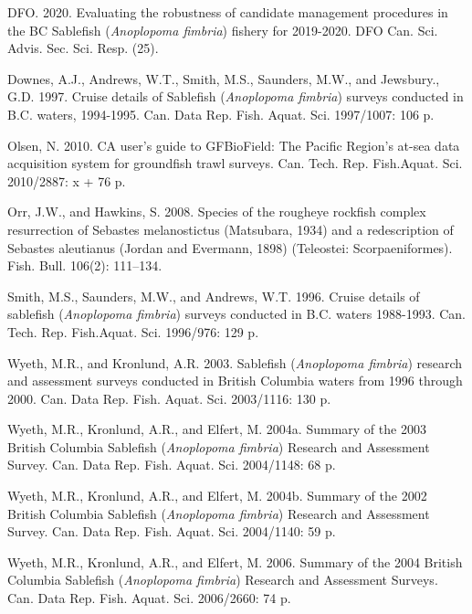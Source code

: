 \documentclass[12pt]{article}\usepackage[]{graphicx}\usepackage[]{color}
\begin{document}
\leavevmode\hypertarget{ref-DFO2020}{}%
DFO. 2020. Evaluating the robustness of candidate management procedures in the BC Sablefish (\emph{Anoplopoma fimbria}) fishery for 2019-2020. DFO Can. Sci. Advis. Sec. Sci. Resp. (25).

\leavevmode\hypertarget{ref-Downes1997}{}%
Downes, A.J., Andrews, W.T., Smith, M.S., Saunders, M.W., and Jewsbury., G.D. 1997. Cruise details of Sablefish (\emph{Anoplopoma fimbria}) surveys conducted in B.C. waters, 1994-1995. Can. Data Rep. Fish. Aquat. Sci. 1997/1007: 106 p.

\leavevmode\hypertarget{ref-Olsen2010}{}%
Olsen, N. 2010. CA user's guide to GFBioField: The Pacific Region's at-sea data acquisition system for groundfish trawl surveys. Can. Tech. Rep. Fish.Aquat. Sci. 2010/2887: x + 76 p.

\leavevmode\hypertarget{ref-Orr2008}{}%
Orr, J.W., and Hawkins, S. 2008. Species of the rougheye rockfish complex resurrection of Sebastes melanostictus (Matsubara, 1934) and a redescription of Sebastes aleutianus (Jordan and Evermann, 1898) (Teleostei: Scorpaeniformes). Fish. Bull. 106(2): 111--134.

\leavevmode\hypertarget{ref-Smith1996}{}%
Smith, M.S., Saunders, M.W., and Andrews, W.T. 1996. Cruise details of sablefish (\emph{Anoplopoma fimbria}) surveys conducted in B.C. waters 1988-1993. Can. Tech. Rep. Fish.Aquat. Sci. 1996/976: 129 p.

\leavevmode\hypertarget{ref-Wyeth2003}{}%
Wyeth, M.R., and Kronlund, A.R. 2003. Sablefish (\emph{Anoplopoma fimbria}) research and assessment surveys conducted in British Columbia waters from 1996 through 2000. Can. Data Rep. Fish. Aquat. Sci. 2003/1116: 130 p.

\leavevmode\hypertarget{ref-Wyeth2004b}{}%
Wyeth, M.R., Kronlund, A.R., and Elfert, M. 2004a. Summary of the 2003 British Columbia Sablefish (\emph{Anoplopoma fimbria}) Research and Assessment Survey. Can. Data Rep. Fish. Aquat. Sci. 2004/1148: 68 p.

\leavevmode\hypertarget{ref-Wyeth2004a}{}%
Wyeth, M.R., Kronlund, A.R., and Elfert, M. 2004b. Summary of the 2002 British Columbia Sablefish (\emph{Anoplopoma fimbria}) Research and Assessment Survey. Can. Data Rep. Fish. Aquat. Sci. 2004/1140: 59 p.

\leavevmode\hypertarget{ref-Wyeth2006}{}%
Wyeth, M.R., Kronlund, A.R., and Elfert, M. 2006. Summary of the 2004 British Columbia Sablefish (\emph{Anoplopoma fimbria}) Research and Assessment Surveys. Can. Data Rep. Fish. Aquat. Sci. 2006/2660: 74 p.
\end{document}
